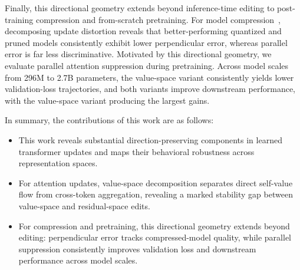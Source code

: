 Finally, this directional geometry extends beyond inference-time editing to
post-training compression and from-scratch pretraining. For model
compression~\citep{Frantar2022GPTQAP,Lin2023AWQAW,Sun2023ASA,men2024shortgpt,He2026UncoveringTR},
decomposing update distortion reveals that better-performing quantized and
pruned models consistently exhibit lower perpendicular error, whereas parallel
error is far less discriminative. Motivated by this directional geometry, we
evaluate parallel attention suppression during pretraining. Across model
scales from 296M to 2.7B parameters, the value-space variant consistently
yields lower validation-loss trajectories, and both variants improve downstream
performance, with the value-space variant producing the largest gains.

\begingroup\setlength{\parskip}{0pt}In summary, the contributions of this work are as follows:
\begin{itemize}
  \setlength{\topsep}{0pt}
  \setlength{\partopsep}{0pt}
  \setlength{\itemsep}{2pt}
  \setlength{\parsep}{0pt}
  \setlength{\parskip}{0pt}
  \item This work reveals substantial direction-preserving components in learned
        transformer updates and maps their behavioral robustness across
        representation spaces.
  \item For attention updates, value-space decomposition separates direct
        self-value flow from cross-token aggregation, revealing a marked
        stability gap between value-space and residual-space edits.
  \item For compression and pretraining, this directional geometry extends beyond
        editing: perpendicular error tracks compressed-model quality, while
        parallel suppression consistently improves validation loss and
        downstream performance across model scales.
\end{itemize}
\endgroup
